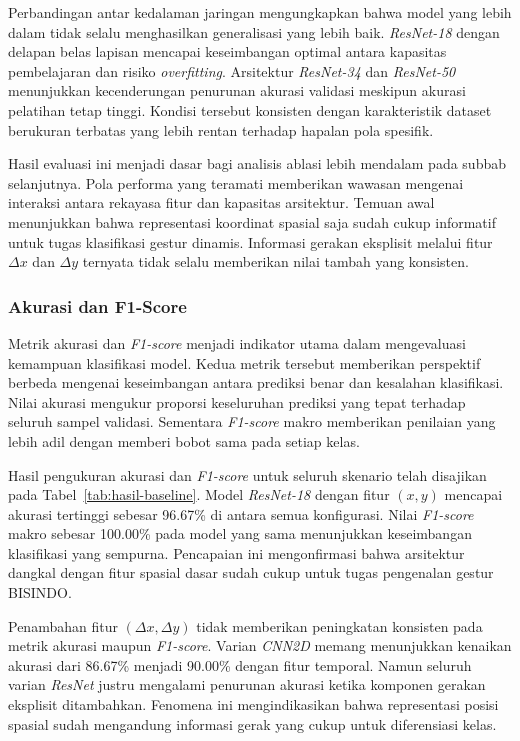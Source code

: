Perbandingan antar kedalaman jaringan mengungkapkan bahwa model yang lebih dalam tidak selalu menghasilkan generalisasi yang lebih baik.
\textit{ResNet-18} dengan delapan belas lapisan mencapai keseimbangan optimal antara kapasitas pembelajaran dan risiko \textit{overfitting}.
Arsitektur \textit{ResNet-34} dan \textit{ResNet-50} menunjukkan kecenderungan penurunan akurasi validasi meskipun akurasi pelatihan tetap tinggi.
Kondisi tersebut konsisten dengan karakteristik dataset berukuran terbatas yang lebih rentan terhadap hapalan pola spesifik.

Hasil evaluasi ini menjadi dasar bagi analisis ablasi lebih mendalam pada subbab selanjutnya.
Pola performa yang teramati memberikan wawasan mengenai interaksi antara rekayasa fitur dan kapasitas arsitektur.
Temuan awal menunjukkan bahwa representasi koordinat spasial saja sudah cukup informatif untuk tugas klasifikasi gestur dinamis.
Informasi gerakan eksplisit melalui fitur $\Delta x$ dan $\Delta y$ ternyata tidak selalu memberikan nilai tambah yang konsisten.

\subsubsection{Akurasi dan F1-Score}
\label{subsubsec:akurasi-f1}

Metrik akurasi dan \textit{F1-score} menjadi indikator utama dalam mengevaluasi kemampuan klasifikasi model.
Kedua metrik tersebut memberikan perspektif berbeda mengenai keseimbangan antara prediksi benar dan kesalahan klasifikasi.
Nilai akurasi mengukur proporsi keseluruhan prediksi yang tepat terhadap seluruh sampel validasi.
Sementara \textit{F1-score} makro memberikan penilaian yang lebih adil dengan memberi bobot sama pada setiap kelas.

Hasil pengukuran akurasi dan \textit{F1-score} untuk seluruh skenario telah disajikan pada Tabel~\ref{tab:hasil-baseline}.
Model \textit{ResNet-18} dengan fitur $(x, y)$ mencapai akurasi tertinggi sebesar 96.67\% di antara semua konfigurasi.
Nilai \textit{F1-score} makro sebesar 100.00\% pada model yang sama menunjukkan keseimbangan klasifikasi yang sempurna.
Pencapaian ini mengonfirmasi bahwa arsitektur dangkal dengan fitur spasial dasar sudah cukup untuk tugas pengenalan gestur BISINDO.

Penambahan fitur $(\Delta x, \Delta y)$ tidak memberikan peningkatan konsisten pada metrik akurasi maupun \textit{F1-score}.
Varian \textit{CNN2D} memang menunjukkan kenaikan akurasi dari 86.67\% menjadi 90.00\% dengan fitur temporal.
Namun seluruh varian \textit{ResNet} justru mengalami penurunan akurasi ketika komponen gerakan eksplisit ditambahkan.
Fenomena ini mengindikasikan bahwa representasi posisi spasial sudah mengandung informasi gerak yang cukup untuk diferensiasi kelas.

